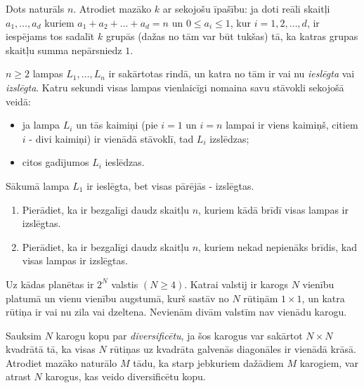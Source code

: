 





\renewcommand{\theenumi}{\alph{enumi}}



\noindent
 
\filbreak

\begin{problem}
Dots naturāls $n$. Atrodiet mazāko  $k$ ar sekojošu īpašību: ja doti reāli skaitļi $a_1, \dots , a_d$ kuriem $a_1 + a_2 + \dots + a_d = n$ un $0 \le a_i \le 1$, kur $i = 1, 2, \dots , d$, ir iespējams tos sadalīt $k$ grupās (dažas no tām var būt tukšas) tā, ka katras grupas skaitļu summa nepārsniedz $1$.

\end{problem}

\begin{problem}

$n \ge 2$ lampas $L_1, \dots, L_n$ ir sakārtotas rindā, un katra no tām ir vai nu \textit{ieslēgta} vai \textit{izslēgta}. Katru sekundi visas lampas vienlaicīgi nomaina savu stāvokli sekojošā veidā:
\begin{itemize}
\item ja lampa $L_i$ un tās kaimiņi (pie $i = 1$ un $i = n$ lampai ir viens kaimiņš, citiem $i$ - divi kaimiņi) ir vienādā stāvoklī, tad $L_i$
izslēdzas;
\item citos gadījumos $L_i$ ieslēdzas.
\end{itemize}

Sākumā lampa $L_1$ ir ieslēgta, bet visas pārējās - izslēgtas.
\begin{enumerate}
\item Pierādiet, ka ir bezgalīgi daudz skaitļu $n$, kuriem kādā brīdī visas lampas ir izslēgtas.
\item Pierādiet, ka ir bezgalīgi daudz skaitļu $n$, kuriem nekad nepienāks brīdis, kad visas lampas ir izslēgtas.
\end{enumerate}


\end{problem}


\begin{problem}
Uz kādas planētas ir $2^N$ valstis $(N \ge 4)$. Katrai valstij ir karogs $N$ vienību platumā un vienu vienību augstumā, kurš sastāv no $N$ rūtiņām $1\times1$, un katra rūtiņa ir vai nu zila vai dzeltena. Nevienām divām valstīm nav vienādu karogu.

Sauksim $N$ karogu kopu par \textit{diversificētu}, ja šos karogus var sakārtot $N \times N$ kvadrātā tā, ka visas $N$ rūtiņas uz kvadrāta galvenās diagonāles ir vienādā krāsā. Atrodiet mazāko naturālo $M$ tādu, ka starp jebkuriem dažādiem $M$ karogiem, var atrast $N$ karogus, kas veido diversificētu kopu.


\end{problem}




